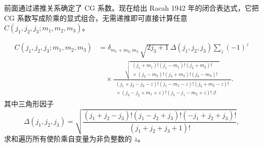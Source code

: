 前面通过递推关系确定了 CG 系数。现在给出 Racah 1942 年的闭合表达式，它把 CG 系数写成阶乘的显式组合，无需递推即可直接计算任意 $C(j_1,j_2,j_3;m_1,m_2,m_3)$。
\begin{theorem}
\[
\begin{aligned}
C(j_1,j_2,j_3;m_1,m_2,m_3)
&=\delta_{m_1+m_2,m_3}\,\sqrt{2j_3+1}\,\Delta(j_1,j_2,j_3)
\sum_z(-1)^z\\
&\quad\times
\frac{
\sqrt{\begin{gathered}
(j_1+m_1)!(j_1-m_1)!(j_2+m_2)!\\[-2pt]
{}\times(j_2-m_2)!(j_3+m_3)!(j_3-m_3)!
\end{gathered}}
}{
\begin{gathered}
(j_1+j_2-j_3-z)!(j_1-m_1-z)!(j_2+m_2-z)!\\[-2pt]
{}\times(j_3-j_2+m_1+z)!(j_3-j_1-m_2+z)!\,z!
\end{gathered}
}.
\end{aligned}
\]
其中三角形因子
\[
\Delta(j_1,j_2,j_3)=\sqrt{\frac{(j_1+j_2-j_3)!(j_1-j_2+j_3)!(-j_1+j_2+j_3)!}{(j_1+j_2+j_3+1)!}},
\]
求和遍历所有使阶乘自变量为非负整数的 $z$。
\label{thm:racah-cg}
\end{theorem}

